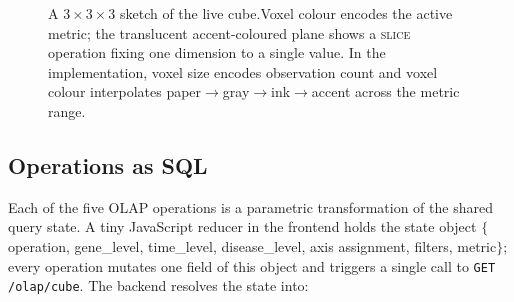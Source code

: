 \documentclass[conference,10pt]{IEEEtran}
\begin{document}
\begin{figure}[t]
\centering
{}
\caption{A $3{\times}3{\times}3$ sketch of the live cube.\;Voxel colour
encodes the active metric; the translucent accent-coloured plane shows a
\textsc{slice} operation fixing one dimension to a single value.
In the implementation, voxel size encodes observation count and voxel
colour interpolates paper$\to$gray$\to$ink$\to$accent across the metric
range.}
\label{fig:cube}
\end{figure}

\subsection*{Operations as SQL}
Each of the five OLAP operations is a parametric transformation of the
shared query state. A tiny JavaScript reducer in the frontend holds the
state object $\{$operation, gene\_level, time\_level, disease\_level,
axis assignment, filters, metric$\}$; every operation mutates one field
of this object and triggers a single call to \texttt{GET /olap/cube}.
The backend resolves the state into:
\end{document}
